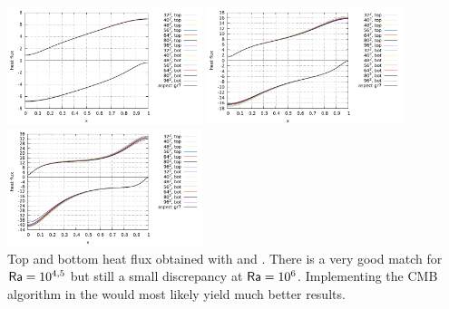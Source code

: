 \begin{center}
\includegraphics[width=5.7cm]{python_codes/fieldstone_110/results_EBA/heatflux_Ra1e4.pdf}
\includegraphics[width=5.7cm]{python_codes/fieldstone_110/results_EBA/heatflux_Ra1e5.pdf}
\includegraphics[width=5.7cm]{python_codes/fieldstone_110/results_EBA/heatflux_Ra1e6.pdf}\\
{\captionfont Top and bottom heat flux obtained with  and \aspect.
There is a very good match for ${\mathsf{Ra}}=10^{4,5}$ but still a small discrepancy at ${\mathsf{Ra}}=10^6$.
Implementing the CMB algorithm in the \stone would most likely yield much better results.
}
\end{center}


